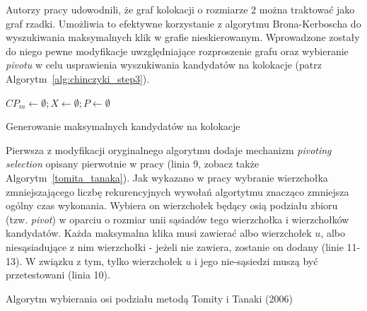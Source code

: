 \documentclass[12pt]{article}
\begin{document}
Autorzy pracy \cite{chinczyki} udowodnili, że graf kolokacji o rozmiarze 2 można traktować jako graf rzadki. Umożliwia to efektywne korzystanie z algorytmu Brona-Kerboscha \cite{kerbosz} do wyszukiwania maksymalnych klik w grafie nieskierowanym. Wprowadzone zostały do niego pewne modyfikacje uwzględniające rozproszenie grafu oraz wybieranie \textit{pivotu} w celu usprawienia wyszukiwania kandydatów na kolokacje (patrz Algorytm~\ref{alg:chinczyki_step3}).

\begin{algorithm}

$CP_{m} \leftarrow \emptyset; X \leftarrow \emptyset; P \leftarrow \emptyset$\;

\caption{Generowanie maksymalnych kandydatów na kolokacje}
\label{alg:chinczyki_step3}
\end{algorithm}

Pierwsza z modyfikacji oryginalnego algorytmu dodaje mechanizm \textit{pivoting selection} opisany pierwotnie w pracy \cite{pivot} (linia 9, zobacz także Algorytm~\ref{tomita_tanaka}). Jak wykazano w pracy \cite{pivot2} wybranie wierzchołka zmniejszającego liczbę rekurencyjnych wywołań algortytmu znacząco zmniejsza ogólny czas wykonania. Wybiera on wierzchołek będący osią podziału zbioru (tzw. \textit{pivot}) w oparciu o rozmiar unii sąsiadów tego wierzchołka i wierzchołków kandydatów. Każda maksymalna klika musi zawierać albo wierzchołek $ u $, albo niesąsiadujące z nim wierzchołki - jeżeli nie zawiera, zostanie on dodany (linie 11-13). W związku z tym, tylko wierzchołek $ u $ i jego nie-sąsiedzi muszą być przetestowani (linia 10).

\begin{algorithm}

\caption{Algorytm wybierania osi podziału metodą Tomity i Tanaki (2006)}
\label{alg:tomita_tanaka}
\end{algorithm}
\end{document}
